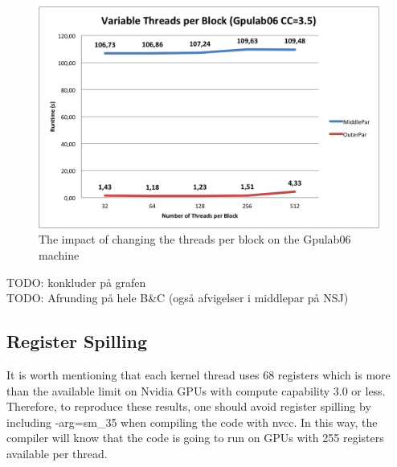 \begin{figure}
\begin{center}
	\includegraphics[width=\textwidth]{img/Gpulab-tpb35.png}
\end{center}
\caption{The impact of changing the threads per block on the Gpulab06 machine}
\end{figure}
TODO: konkluder på grafen \\

TODO:
Afrunding på hele B\&C (også afvigelser i middlepar på NSJ)

\subsection{Register Spilling}
It is worth mentioning that each kernel thread uses 68 registers which is more than the available limit on Nvidia GPUs with compute capability 3.0 or less. Therefore, to reproduce these results, one should avoid register spilling by including -arg=sm_35 when compiling the code with nvcc. In this way, the compiler will know that the code is going to run on GPUs with 255 registers available per thread.